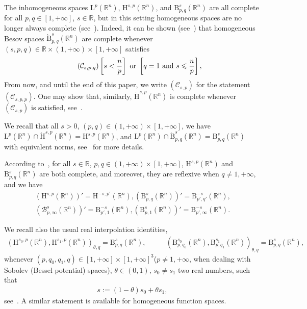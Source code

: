 \documentclass[10pt]{amsart}
\theoremstyle{definition}\newtheorem{defi}[theo]{Definition}\newtheorem{rema}[theo]{Remark}\newtheorem{exam}[theo]{Example}\newtheorem{exem}[theo]{Example}\newtheorem{nota}[theo]{Notation}
\newcommand{\bbR}{\mathbb{R}}
\newcommand{\rmH}{\mathrm{H}}%
\newcommand{\rmB}{\mathrm{B}}
\newcommand{\rmL}{\mathrm{L}}
\newcommand{\clB}{\mathcal{B}}
\newcommand{\clC}{\mathcal{C}}
\begin{document}
The inhomogeneous spaces $\rmL^p(\bbR^n)$, $\rmH^{s,p}(\bbR^n)$, and $\rmB^{s}_{p,q}(\bbR^n)$ are all complete for all $p,q\in [1,+\infty]$, $s\in\bbR$, but in this setting homogeneous spaces are no longer always complete (see~\cite[Proposition~1.34,~Remark~2.26]{bookBahouriCheminDanchin}). Indeed, it can be shown (see~\cite[Theorem~2.25]{bookBahouriCheminDanchin}) that homogeneous Besov spaces $\dot{\rmB}^{s}_{p,q}(\bbR^n)$ are complete whenever $(s,p,q)\in\bbR\times(1,+\infty)\times[1,+\infty]$ satisfies
\begin{equation}
\tag{$\clC_{s,p,q}$}\label{AssumptionCompletenessExponents}
\left[s<\frac{n}{p} \right]\text{ or }\left[q=1\text{ and } s\leqslant\frac{n}{p} \right],
\end{equation}
From now, and until the end of this paper, we write $(\clC_{s,p})$ for the statement $(\clC_{s,p,p})$. One may show that, similarly, $\dot{\rmH}^{s,p}(\bbR^n)$ is complete whenever $(\clC_{s,p})$ is satisfied, see~\cite[Proposition~2.2]{Gaudin2022}.

We recall that all $s>0$, $(p,q)\in(1,+\infty)\times[1,+\infty]$, we have $\rmL^p(\bbR^n)\cap \dot{\rmH}^{s,p}(\bbR^n) = \rmH^{s,p}(\bbR^n)$, and $\rmL^p(\bbR^n)\cap \dot{\rmB}^{s}_{p,q}(\bbR^n) =\rmB^{s}_{p,q}(\bbR^n)$ with equivalent norms, see~\cite[Theorem~6.3.2]{BerghLofstrom1976} for more details.

According to~\cite[Section~6.4]{BerghLofstrom1976}, for all $s\in\bbR$, $p,q\in(1,+\infty)\times[1,+\infty]$, $\rmH^{s,p}(\bbR^n)$ and $\rmB^{s}_{p,q}(\bbR^n)$ are both complete, and moreover, they are reflexive when $q\neq1,+\infty$, and we have
\begin{align}
(\rmH^{s,p}(\bbR^n))' = \rmH^{-s,p'}(\bbR^n),  \left(\rmB^{s}_{p,q}(\bbR^n)\right)'=\rmB^{-s}_{p',q'}(\bbR^n) \text{,}\\
\left(\clB^{s}_{p,\infty}(\bbR^n)\right)'=\rmB^{-s}_{p',1}(\bbR^n), \left(\rmB^{s}_{p,1}(\bbR^n)\right)'=\rmB^{-s}_{p',\infty}(\bbR^n) .
\end{align}

We recall also the usual real interpolation identities,
\begin{align*}
\left(\rmH^{s_0,p}(\bbR^n),\rmH^{s_1,p}(\bbR^n)\right)_{\theta,q}= \rmB^{s}_{p,q}(\bbR^n),&\qquad \left(\rmB^{s_0}_{p,q_0}(\bbR^n),\rmB^{s_1}_{p,q_1}(\bbR^n)\right)_{\theta,q} = \rmB^{s}_{p,q}(\bbR^n),
\end{align*}
whenever $(p,q_0,q_1,q)\in[1,+\infty]\times[1,+\infty]^3$($p\neq 1,+\infty$, when dealing with Sobolev (Bessel potential) spaces), $\theta\in(0,1)$, $s_0\neq s_1$ two real numbers, such that
\begin{align*}
s:= (1-\theta)s_0+ \theta s_1,
\end{align*}
see~\cite[Theorem~6.4.5]{BerghLofstrom1976}. A similar statement is available for homogeneous function spaces.
\end{document}
